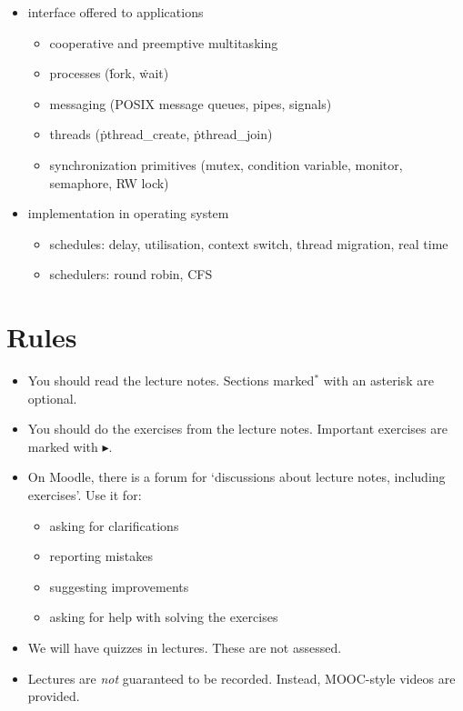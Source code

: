 \begin{itemize}
\begin{itemize}
  \item interface offered to applications
    \begin{itemize}
    \item cooperative and preemptive multitasking
    \item processes (\.{fork}, \.{wait})
    \item messaging (POSIX message queues, pipes, signals)
    \item threads (\.{pthread\_create}, \.{pthread\_join})
    \item synchronization primitives
      (mutex, condition variable, monitor, semaphore, RW lock)
    \end{itemize}
  \item implementation in operating system
    \begin{itemize}
    \item schedules: delay, utilisation, context switch, thread migration, real time
    \item schedulers: round robin, CFS
    \end{itemize}
  \end{itemize}
\end{itemize}

\section{Rules}

\begin{itemize}
\item
  You should read the lecture notes.
  Sections marked$^\ast$ with an asterisk are optional.
\item
  You should do the exercises from the lecture notes.
  Important exercises are marked with $\blacktriangleright$.
\item
  On Moodle,
    there is a forum for `discussions about lecture notes, including exercises'.
  Use it for:
  \begin{itemize}
  \item asking for clarifications
  \item reporting mistakes
  \item suggesting improvements
  \item asking for help with solving the exercises
  \end{itemize}
\item
  We will have quizzes in lectures.
  These are not assessed.
\item
  Lectures are \emph{not} guaranteed to be recorded.
  Instead, MOOC-style videos are provided.
\end{itemize}

